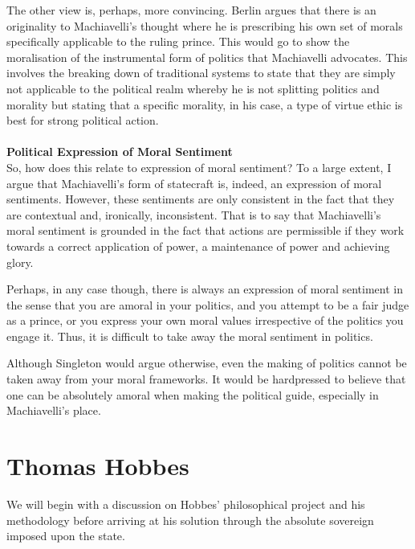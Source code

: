 \documentclass[12pt, letterpaper]{article}
\begin{document}
The other view is, perhaps, more convincing. Berlin argues that there is an originality to Machiavelli's thought where he is prescribing his own set of morals specifically applicable to the ruling prince. This would go to show the moralisation of the instrumental form of politics that Machiavelli advocates. This involves the breaking down of traditional systems to state that they are simply not applicable to the political realm whereby he is not splitting politics and morality but stating that a specific morality, in his case, a type of virtue ethic is best for strong political action.
\\\\
\textbf{Political Expression of Moral Sentiment}\\
So, how does this relate to expression of moral sentiment? To a large extent, I argue that Machiavelli's form of statecraft is, indeed, an expression of moral sentiments. However, these sentiments are only consistent in the fact that they are contextual and, ironically, inconsistent. That is to say that Machiavelli's moral sentiment is grounded in the fact that actions are permissible if they work towards a correct application of power, a maintenance of power and achieving glory.

Perhaps, in any case though, there is always an expression of moral sentiment in the sense that you are amoral in your politics, and you attempt to be a fair judge as a prince, or you express your own moral values irrespective of the politics you engage it. Thus, it is difficult to take away the moral sentiment in politics.

Although Singleton would argue otherwise, even the making of politics cannot be taken away from your moral frameworks. It would be hardpressed to believe that one can be absolutely amoral when making the political guide, especially in Machiavelli's place. 


\newpage
\section{Thomas Hobbes}
We will begin with a discussion on Hobbes' philosophical project and his methodology before arriving at his solution through the absolute sovereign imposed upon the state.
\end{document}
